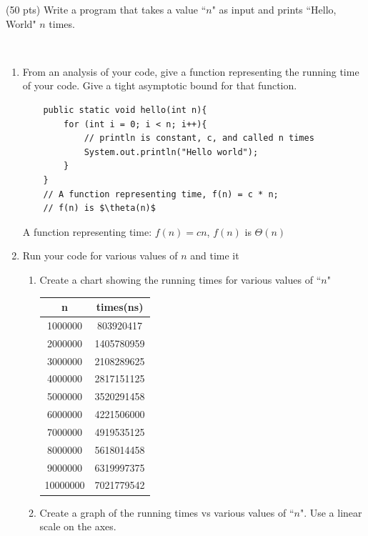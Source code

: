 \documentclass{article}
\newenvironment{sol}[1][Solution]{\begin{trivlist}\item[\hskip\labelsep {\bfseries #1:}]}{\end{trivlist}}
\begin{document}
\begin{enumerate}
    \item (50 pts) Write a program that takes a value ``$n$" as input and prints ``Hello, World" $n$ times.
    \begin{sol}
    ~\
    \begin{enumerate}
        \item From an analysis of your code, give a function representing the running time of your code. Give a tight asymptotic bound for that function. 


\begin{verbatim}
    public static void hello(int n){
        for (int i = 0; i < n; i++){
            // println is constant, c, and called n times
            System.out.println("Hello world");
        }
    }
    // A function representing time, f(n) = c * n;
    // f(n) is $\theta(n)$
\end{verbatim}
A function representing time: $f(n) = c n$, $f(n)$ is $\Theta(n)$ \\
\item Run your code for various values of $n$ and time it
\begin{enumerate}
    \item Create a chart showing the running times for various values of ``$n$"
    \begin{center}
    \begin{tabular}{c|c}
    \hline
    n & times(ns)  \\
    \hline 
    1000000 & 803920417\\
    \hline
    2000000 & 1405780959 \\
    \hline
    3000000 & 2108289625 \\
    \hline
    4000000 & 2817151125 \\
    \hline 
    5000000 & 3520291458 \\
    \hline
    6000000 & 4221506000 \\
    \hline 
    7000000 & 4919535125 \\
    \hline 
    8000000 & 5618014458 \\
    \hline 
    9000000 & 6319997375 \\
    \hline
    10000000 & 7021779542 \\
    \hline 
    \end{tabular}
    \end{center} 
    \item Create a graph of the running times vs various values of ``$n$". Use a linear scale on the axes.\\

\end{enumerate}
\end{enumerate}
\end{sol}
\end{enumerate}
\end{document}
